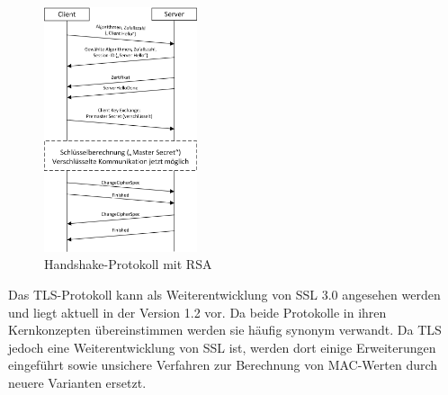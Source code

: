 \documentclass  [paper=a4,
				fontsize=12pt,
				listof=totoc,
				bibliography=totoc
				]{scrreprt}
\begin{document}
			\begin{figure} %
				\centering
				\includegraphics[width=0.4\textwidth]{images/MSC_Transport.png}
				\caption[Handshake-Protokoll mit RSA]{Handshake-Protokoll mit RSA\footnotemark} %
				\label{img:MSC_Transport} %
			\end{figure} 
			Das \ac{TLS}-Protokoll kann als Weiterentwicklung von \ac{SSL} 3.0 angesehen werden und liegt aktuell in der Version 1.2 vor.
			Da beide Protokolle in ihren Kernkonzepten übereinstimmen werden sie häufig synonym verwandt. Da \ac{TLS} jedoch eine Weiterentwicklung von \ac{SSL} ist, werden dort einige Erweiterungen eingeführt sowie unsichere Verfahren zur Berechnung von \ac{MAC}-Werten durch neuere Varianten ersetzt.\\
		
			
\end{document}
